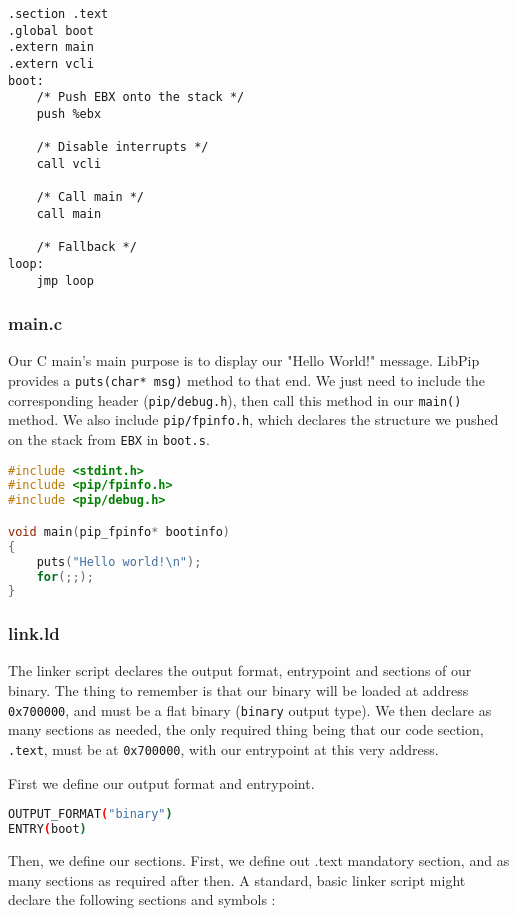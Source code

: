 \documentclass[10pt,a4paper,titlepage]{refart}
\begin{document}
\begin{lstlisting}[language={[x86masm]Assembler},caption={boot.s}]
.section .text
.global boot
.extern main
.extern vcli
boot:
    /* Push EBX onto the stack */
    push %ebx

    /* Disable interrupts */
    call vcli

    /* Call main */
    call main
    
    /* Fallback */
loop:
    jmp loop
\end{lstlisting}
\subsubsection{main.c}
Our C main's main purpose is to display our "Hello World!" message. LibPip provides a \texttt{puts(char* msg)} method to that end. We just need to include the corresponding header (\texttt{pip/debug.h}), then call this method in our \texttt{main()} method. We also include \texttt{pip/fpinfo.h}, which declares the structure we pushed on the stack from \texttt{EBX} in \texttt{boot.s}.

\begin{lstlisting}[language=C,caption={main.c}]
#include <stdint.h>
#include <pip/fpinfo.h>
#include <pip/debug.h>

void main(pip_fpinfo* bootinfo)
{
	puts("Hello world!\n");
	for(;;);
}
\end{lstlisting}
\subsubsection{link.ld}
The linker script declares the output format, entrypoint and sections of our binary. The thing to remember is that our binary will be loaded at address \texttt{0x700000}, and must be a flat binary (\texttt{binary} output type). We then declare as many sections as needed, the only required thing being that our code section, \texttt{.text}, must be at \texttt{0x700000}, with our entrypoint at this very address.

First we define our output format and entrypoint.

\begin{lstlisting}[language=bash,caption={link.ld output and entrypoint}]
OUTPUT_FORMAT("binary")
ENTRY(boot)
\end{lstlisting}

Then, we define our sections. First, we define out .text mandatory section, and as many sections as required after then. A standard, basic linker script might declare the following sections and symbols :
\end{document}
